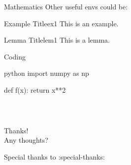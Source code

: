 \documentclass[xcolor=dvipsnames,t,aspectratio=169]{beamer} %
\newcommand{\highlight}[1]{{\color{fgv_light_blue} #1}}
\begin{document}
\begin{frame}[c]{Mathematics}
    Other useful envs could be:

    \begin{ex}{Example Title}{ex1}
        This is an example.
    \end{ex}

    \begin{lem}{Lemma Title}{lem1}
        This is a lemma.
    \end{lem}

\end{frame}

\begin{frame}[c, fragile]{Coding}
    \begin{code}{python}
        import numpy as np
        
        def f(x):
            return x**2
    \end{code}
\end{frame}

\begin{frame}
    \frametitle{~}
        \vfill
        \begin{center}
            {\Huge Thanks!}\vspace{1.5em}\\
            {\Large \highlight{Any thoughts?}}\\
        \end{center}
        \vfill
        \begin{center}
            {\small Special thanks to :special-thanks:}
        \end{center}
\end{frame}
\end{document}
